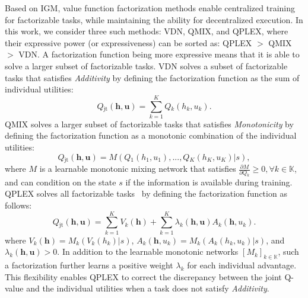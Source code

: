 \documentclass[twoside,11pt]{article}
\newcommand{\state}{s}
\newcommand{\jointaction}{\mathbf{u}}
\newcommand{\action}{u}
\newcommand{\jointobservationhistory}{\mathbf{h}}
\newcommand{\observationhistory}{h}
\newcommand{\agentspace}{\mathbb{K}}
\newcommand{\agentcounter}{k}
\newcommand{\numberofagents}{K}
\newcommand{\utilityexp}{Q}
\newcommand{\utilityadv}{A}
\newcommand{\utilitystate}{V}
\newcommand{\joint}{\mathrm{jt}}
\newcommand{\monotonicfunction}{M}
\newcommand{\additivity}{\textit{Additivity}}
\newcommand{\monotonicity}{\textit{Monotonicity}}
\begin{document}
Based on IGM, value function factorization methods enable centralized training for factorizable tasks, while maintaining the ability for decentralized execution. In this work, we consider three such methods: VDN, QMIX, and QPLEX, where their expressive power (or expressiveness) can be sorted as: QPLEX $>$ QMIX $>$ VDN. A factorization function being more expressive means that it is able to solve a larger subset of factorizable tasks.
VDN solves a subset of factorizable tasks that satisfies \additivity{} by defining the factorization function as the sum of individual utilities:
\begin{equation} \utilityexp{}_{\joint{}}(\jointobservationhistory{},\jointaction{}) = \sum^{\numberofagents{}}_{\agentcounter{}=1} \utilityexp{}_\agentcounter{}(\observationhistory{}_\agentcounter{},\action{}_\agentcounter{}).
\label{eq:additivity}
\end{equation}
QMIX solves a larger subset of factorizable tasks that satisfies \monotonicity{} by defining the factorization function as a monotonic combination of the individual utilities:
\begin{equation} \utilityexp{}_{\joint{}}(\jointobservationhistory{},\jointaction{}) = \monotonicfunction(\utilityexp{}_1(\observationhistory{}_1,\action{}_1),...,\utilityexp{}_\numberofagents{}(\observationhistory{}_\numberofagents{},\action{}_\numberofagents{})\vert\state),
\label{eq:monotonicity}
\end{equation}
where $\monotonicfunction$ is a learnable monotonic mixing network that satisfies $\frac{\partial \monotonicfunction}{\partial \utilityexp{}_\agentcounter{}}\ge 0, \forall \agentcounter{}\in\agentspace{}$, and can condition on the state $\state$ if the information is available during training.
QPLEX solves all factorizable tasks~\citep{Wang2020QPLEX} by defining the factorization function as follows:
\begin{equation}
\utilityexp{}_{\joint{}}(\jointobservationhistory{},\jointaction{}) = \sum^{\numberofagents{}}_{\agentcounter{}=1} \utilitystate_\agentcounter{}(\jointobservationhistory{}) + \sum^{\numberofagents{}}_{\agentcounter{}=1}\lambda_\agentcounter{}(\jointobservationhistory{},\jointaction{}) \utilityadv_\agentcounter{}(\jointobservationhistory{},\action{}_\agentcounter{}).
\label{eq:qplex}
\end{equation}
where $\utilitystate_\agentcounter{}(\jointobservationhistory{})=\monotonicfunction_\agentcounter{}(\utilitystate_\agentcounter{}(\observationhistory{}_\agentcounter{})\vert\state)$, $\utilityadv_\agentcounter{}(\jointobservationhistory{},\action{}_\agentcounter{})=\monotonicfunction_\agentcounter{}(\utilityadv_\agentcounter{}(\observationhistory{}_\agentcounter{},\action{}_\agentcounter{})\vert\state)$, and $\lambda_\agentcounter{}(\jointobservationhistory{},\jointaction{})>0$. In addition to the learnable monotonic networks $[\monotonicfunction_\agentcounter]_{\agentcounter{}\in\agentspace{}}$, such a factorization further learns a positive weight $\lambda_\agentcounter{}$ for each individual advantage. This flexibility enables QPLEX to correct the discrepancy between the joint Q-value and the individual utilities when a task does not satisfy \additivity{}.
\end{document}
